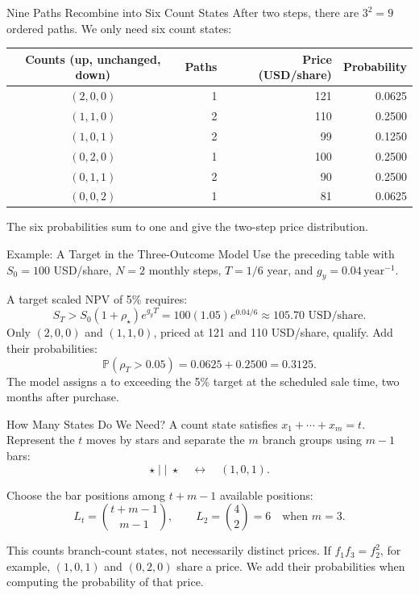 \documentclass[aspectratio=169,11pt]{beamer}
\newcommand{\Pmeasure}{\mathbb{P}}
\begin{document}
\begin{frame}{Nine Paths Recombine into Six Count States}
After two steps, there are $3^2=9$ ordered paths. We only need six count states:

  \vspace{0.35em}
  \begin{center}
    \renewcommand{\arraystretch}{1.18}
    \begin{tabular}{crrr}
      \toprule
      Counts (up, unchanged, down) & Paths & Price (USD/share) & Probability\\
      \midrule
      $(2,0,0)$ & 1 & 121 & 0.0625\\
      $(1,1,0)$ & 2 & 110 & 0.2500\\
      $(1,0,1)$ & 2 & 99 & 0.1250\\
      $(0,2,0)$ & 1 & 100 & 0.2500\\
      $(0,1,1)$ & 2 & 90 & 0.2500\\
      $(0,0,2)$ & 1 & 81 & 0.0625\\
      \bottomrule
    \end{tabular}
  \end{center}

  The six probabilities sum to one and give the two-step price distribution.
\end{frame}

\begin{frame}{Example: A Target in the Three-Outcome Model}
Use the preceding table with $S_0=100$ USD/share, $N=2$ monthly steps,
  $T=1/6$ year, and $g_y=0.04\,\mathrm{year}^{-1}$.

  \vspace{0.5em}
  A target scaled NPV of 5\% requires:
  \[
    S_T>S_0(1+\rho_\star)e^{g_yT}
    =100(1.05)e^{0.04/6}\approx105.70\text{ USD/share}.
  \]
  Only $(2,0,0)$ and $(1,1,0)$, priced at 121 and 110 USD/share, qualify.
  Add their probabilities:
  \[
    \Pmeasure(\rho_T>0.05)=0.0625+0.2500=0.3125.
  \]
  The model assigns a  to exceeding the 5\% target
  at the scheduled sale time, two months after purchase.
\end{frame}

\begin{frame}{How Many States Do We Need?}
A count state satisfies $x_1+\cdots+x_m=t$. Represent the $t$ moves by stars
  and separate the $m$ branch groups using $m-1$ bars:
  \[
    \star\;|\;|\;\star\quad\longleftrightarrow\quad(1,0,1).
  \]

  Choose the bar positions among $t+m-1$ available positions:
  \[
    L_t=\binom{t+m-1}{m-1},
    \qquad L_2=\binom42=6\quad\text{when }m=3.
  \]

  This counts branch-count states, not necessarily distinct prices. If
  $f_1f_3=f_2^2$, for example, $(1,0,1)$ and $(0,2,0)$ share a price.
  We add their probabilities when computing the probability of that price.
\end{frame}
\end{document}
